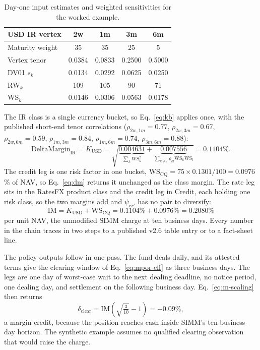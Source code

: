 \begin{table}[h]
\centering\small
\caption{Day-one input estimates and weighted sensitivities for the worked example.}
\label{tab:agg-example-inputs}
\begin{tabular}{@{}lcccc@{}}
\toprule
USD IR vertex & 2w & 1m & 3m & 6m \\
\midrule
Maturity weight & 35 & 35 & 25 & 5 \\
Vertex tenor & 0.0384 & 0.0833 & 0.2500 & 0.5000 \\
DV01 $s_k$ & 0.0134 & 0.0292 & 0.0625 & 0.0250 \\
$\mathrm{RW}_k$ & 109 & 105 & 90 & 71 \\
$\mathrm{WS}_k$ & 0.0146 & 0.0306 & 0.0563 & 0.0178 \\
\bottomrule
\end{tabular}
\end{table}

The IR class is a single currency bucket, so Eq.~\eqref{eq:kb} applies once,
with the published short-end tenor correlations ($\rho_{2w,1m}=0.77$,
$\rho_{2w,3m}=0.67$, $\rho_{2w,6m}=0.59$, $\rho_{1m,3m}=0.84$, $\rho_{1m,6m}=0.74$,
$\rho_{3m,6m}=0.88$):
\begin{equation}\label{eq:example-ir}
\mathrm{DeltaMargin}_{\mathrm{IR}}=K_{\mathrm{USD}}
=\sqrt{\underbrace{0.004631}_{\sum_k\mathrm{WS}_k^2}
+\underbrace{0.007556}_{\sum_{k\neq l}\rho_{kl}\mathrm{WS}_k\mathrm{WS}_l}}
=0.1104\%.
\end{equation}
The credit leg is one risk factor in one bucket,
$\mathrm{WS}_{\mathrm{CQ}}=75\times0.1301/100=0.0976$\% of NAV, so Eq.~\eqref{eq:dm}
returns it unchanged as the class margin. The rate leg sits in the RatesFX product class and
the credit leg in Credit, each holding one risk class, so the two margins add and
$\psi_{rr'}$ has no pair to diversify:
\begin{equation}\label{eq:example-im}
\mathrm{IM}=K_{\mathrm{USD}}+\mathrm{WS}_{\mathrm{CQ}}=0.1104\%+0.0976\%=0.2080\%
\end{equation}
per unit NAV, the unmodified SIMM charge at ten business days. Every number in the chain
traces in two steps to a published v2.6 table entry or to a fact-sheet line.

The policy outputs follow in one pass. The fund deals daily, and its attested terms give the clearing window of Eq.~\eqref{eq:mpor-eff} as three business days. The legs are one day of worst-case wait to the next dealing deadline, no notice period, one dealing day, and settlement on the following business day. Eq.~\eqref{eq:m-scaling} then returns
\begin{equation}\label{eq:example-dclear}
\delta_{\mathrm{clear}}=\mathrm{IM}\!\left(\sqrt{\tfrac{3}{10}}-1\right)=-0.09\%,
\end{equation}
a margin credit, because the position reaches cash inside SIMM's ten-business-day horizon. The synthetic example assumes no qualified clearing observation that would raise the charge.

